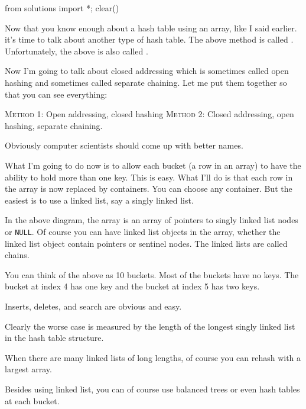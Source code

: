 \begin{python0}
from solutions import *; clear()
\end{python0}

Now that you know enough about a hash table using an array,
like I said earlier. it's time to talk about another type of hash table.
The above method is called .
Unfortunately, the above is also called .

Now I'm going to talk about closed addressing which is sometimes called
open hashing and sometimes called separate chaining.
Let me put them together so that you can see everything:
\begin{tightlist}
\li \textsc{Method 1}: Open addressing, closed hashing
\li \textsc{Method 2}: Closed addressing, open hashing, separate chaining.
\end{tightlist}
Obviously computer scientists should come up with better
names.

What I'm going to do now is to allow each bucket
(a row in an array) to have the ability to hold more than one key.
This is easy.
What I'll do is that each row in the array is now replaced by 
containers.
You can choose any container.
But the easiest is to use a linked list, say a singly linked list.


In the above diagram, the array is an array of pointers to singly linked list nodes
or \verb!NULL!.
Of course you can have linked list objects in the array, 
whether the linked list object contain pointers or sentinel nodes.
The linked lists are called chains.

You can think of the above as 10 buckets.
Most of the buckets have no keys.
The bucket at index 4 has one key
and the bucket at index 5 has two keys.

Inserts, deletes, and search are obvious and easy.

Clearly the worse case is measured by the length of the longest singly
linked list in the hash table structure.

When there are many linked lists of long lengths,
of course you can rehash with a largest array.

Besides using linked list, you can of course use balanced trees or even
hash tables at each bucket.



\newpage
